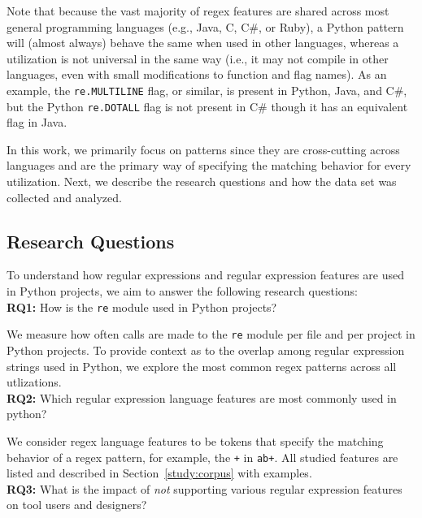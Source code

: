 Note that because the vast majority of regex features are shared across most general programming languages (e.g., Java, C, C\#, or Ruby), a Python {pattern} will (almost always) behave the same when used in other languages, whereas a utilization is not universal in the same way (i.e., it may not compile in other languages, even with small modifications to function and flag names).
As an example, the {\tt re.MULTILINE} flag, or similar, is present in Python, Java, and C\#, but  the Python {\tt re.DOTALL} flag is not present in C\# though it has an equivalent flag in Java.

In this work, we primarily focus on patterns since they are cross-cutting across languages and are the primary way of specifying the matching behavior for every utilization. Next, we describe the research questions and how the data set was collected and analyzed.

\subsection{Research Questions}
\label{sec:rqs}
To understand how regular expressions and regular expression features are used in Python projects, we aim to answer the following research questions:\\

\noindent \textbf{RQ1:} How  is the {\tt re} module used in Python projects?

We measure how often calls are made to the {\tt re} module per file and per project in Python projects.
To provide context as to the overlap among regular expression strings used in Python, we explore the most common regex {patterns} across all utlizations.\\

\noindent \textbf{RQ2:} Which regular expression language features are most commonly used in python?

We consider regex language features to be tokens that specify the matching behavior of a regex pattern, for example,  the {\tt +} in {\tt ab+}.  All studied features are listed and described in Section~\ref{study:corpus} with examples.\\

\noindent \textbf{RQ3:} What is the impact of \emph{not} supporting various regular expression features on tool users and designers?

